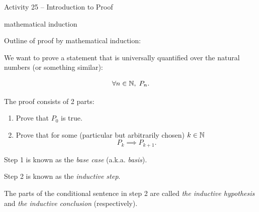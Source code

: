 \documentclass{amsart}
\begin{document}
\thispagestyle{empty}

\centerline{\Large Activity 25 -- Introduction to Proof}
\centerline{\large mathematical induction}

\bigskip
\Large


Outline of proof by mathematical induction:

We want to prove a statement that is universally quantified over the natural numbers (or something similar):

\[ \forall n \in {\mathbb N}, \; P_n. \]

The proof consists of 2 parts:

\begin{enumerate}
\item Prove that $P_0$ is true.
\item Prove that for some (particular but arbitrarily chosen) $k \in {\mathbb N}$
\[ P_k \implies P_{k+1}. \]
\end{enumerate}

Step 1 is known as the {\em base case}  (a.k.a. {\em basis}).

Step 2 is known as the {\em inductive step}.

The parts of the conditional sentence in step 2 are called {\em the inductive hypothesis} and {\em the inductive conclusion} (respectively).

\vspace{.3in}
\end{document}
